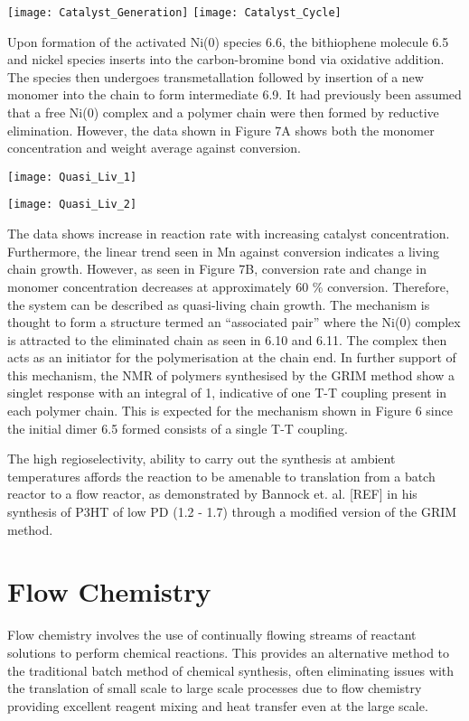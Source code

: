\texttt{[image: Catalyst\_Generation]}
\texttt{[image: Catalyst\_Cycle]}

Upon formation of the activated Ni(0) species 6.6, the bithiophene molecule 6.5 and nickel species inserts into the carbon-bromine bond via oxidative addition. The species then undergoes transmetallation followed by insertion of a new monomer into the chain to form intermediate 6.9. It had previously been assumed that a free Ni(0) complex and a polymer chain were then formed by reductive elimination. However, the data shown in Figure 7A shows both the monomer concentration and weight average against conversion. 

\texttt{[image: Quasi\_Liv\_1]}

\texttt{[image: Quasi\_Liv\_2]}

The data shows increase in reaction rate with increasing catalyst concentration. Furthermore, the linear trend seen in Mn against conversion indicates a living chain growth. However, as seen in Figure 7B, conversion rate and change in monomer concentration decreases at approximately 60 \% conversion. Therefore, the system can be described as quasi-living chain growth. The mechanism is thought to form a structure termed an “associated pair” where the Ni(0) complex is attracted to the eliminated chain as seen in 6.10 and 6.11. The complex then acts as an initiator for the polymerisation at the chain end. In further support of this mechanism, the NMR of polymers synthesised by the GRIM method show a singlet response with an integral of 1, indicative of one T-T coupling present in each polymer chain. This is expected for the mechanism shown in Figure 6 since the initial dimer 6.5 formed consists of a single T-T coupling. 

The high regioselectivity, ability to carry out the synthesis at ambient temperatures affords the reaction to be amenable to translation from a batch reactor to a flow reactor, as demonstrated by Bannock et. al. [REF] in his synthesis of P3HT of low PD (1.2 - 1.7) through a modified version of the GRIM method. 

\section{Flow Chemistry}

Flow chemistry involves the use of continually flowing streams of reactant solutions to perform chemical reactions. This provides an alternative method to the traditional batch method of chemical synthesis, often eliminating issues with the translation of small scale to large scale processes due to flow chemistry providing excellent reagent mixing and heat transfer even at the large scale. 

